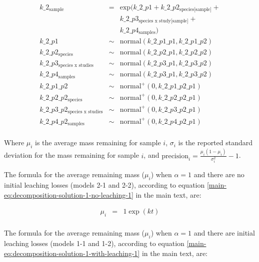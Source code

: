 \documentclass[
  12pt,
]{article}
\begin{document}
\begin{equation}
\begin{aligned}
k\_2_{\text{sample}} & = & \text{exp}(k\_2\_p1 + k\_2\_p2_{\text{species[sample]}} + \\
                         && k\_2\_p3_{\text{species x study[sample]}} + \\
                         && k\_2\_p4_{\text{samples}})\\
k\_2\_p1 & \sim & \text{normal}(k\_2\_p1\_p1, k\_2\_p1\_p2)\\
k\_2\_p2_{\text{species}} & \sim & \text{normal}(k\_2\_p2\_p1, k\_2\_p2\_p2)\\
k\_2\_p3_{\text{species x studies}} & \sim & \text{normal}(k\_2\_p3\_p1, k\_2\_p3\_p2)\\
k\_2\_p4_{\text{samples}} & \sim & \text{normal}(k\_2\_p3\_p1, k\_2\_p3\_p2)\\
k\_2\_p1\_p2 & \sim &  \text{normal}^+(0, k\_2\_p1\_p2\_p1)\\
k\_2\_p2\_p2_{\text{species}} & \sim &  \text{normal}^+(0, k\_2\_p2\_p2\_p1)\\
k\_2\_p3\_p2_{\text{species x studies}} & \sim &  \text{normal}^+(0, k\_2\_p3\_p2\_p1)\\
k\_2\_p4\_p2_{\text{samples}} & \sim &  \text{normal}^+(0, k\_2\_p4\_p2\_p1)\\
\label{eq:sup-model-1}
\end{aligned}
\end{equation}

Where \(\mu_i\) is the average mass remaining for sample \(i\), \(\sigma_i\) is the reported standard deviation for the mass remaining for sample \(i\), and \(\text{precision}_i = \frac{\mu_i(1 - \mu_i)}{\sigma_i^2} -1\).

The formula for the average remaining mass (\(\mu_i\)) when \(\alpha=1\) and there are no initial leaching losses (models 2-1 and 2-2), according to equation \ref{main-eq:decomposition-solution-1-no-leaching-1} in the main text, are:

\begin{equation}
\begin{aligned}
\mu_i & = & 1 \exp(k t)\\
\label{eq:sup-model-2}
\end{aligned}
\end{equation}

The formula for the average remaining mass (\(\mu_i\)) when \(\alpha=1\) and there are initial leaching losses (models 1-1 and 1-2), according to equation \ref{main-eq:decomposition-solution-1-with-leaching-1} in the main text, are:
\end{document}
